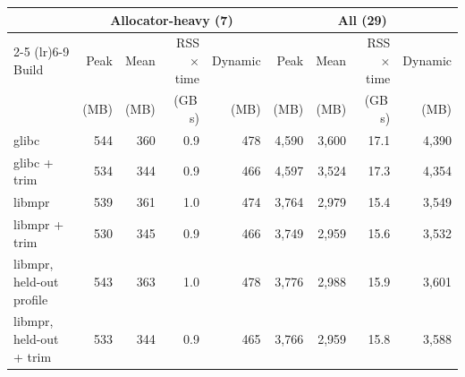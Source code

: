 \begin{tabular}{lrrrrrrrr}
\toprule
 & \multicolumn{4}{c}{Allocator-heavy (7)} & \multicolumn{4}{c}{All (29)} \\
\cmidrule(lr){2-5} \cmidrule(lr){6-9}
Build & Peak & Mean & RSS$\times$time & Dynamic & Peak & Mean & RSS$\times$time & Dynamic \\
 & (MB) & (MB) & (GB\,s) & (MB) & (MB) & (MB) & (GB\,s) & (MB) \\
\midrule
glibc & 544 & 360 & 0.9 & 478 & 4{,}590 & 3{,}600 & 17.1 & 4{,}390 \\
glibc + trim & 534 & 344 & 0.9 & 466 & 4{,}597 & 3{,}524 & 17.3 & 4{,}354 \\
libmpr & 539 & 361 & 1.0 & 474 & 3{,}764 & 2{,}979 & 15.4 & 3{,}549 \\
libmpr + trim & 530 & 345 & 0.9 & 466 & 3{,}749 & 2{,}959 & 15.6 & 3{,}532 \\
libmpr, held-out profile & 543 & 363 & 1.0 & 478 & 3{,}776 & 2{,}988 & 15.9 & 3{,}601 \\
libmpr, held-out + trim & 533 & 344 & 0.9 & 465 & 3{,}766 & 2{,}959 & 15.8 & 3{,}588 \\
\bottomrule
\end{tabular}
